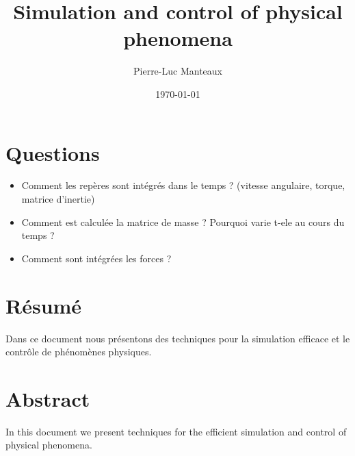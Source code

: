 \documentclass[11pt, oneside, a4paper]{memoir}
\begin{document}
\title{Simulation and control of physical phenomena}
\author{Pierre-Luc Manteaux}
\date{\today}
\maketitle

\frontmatter



\chapter{Questions}

\begin{itemize}
\item Comment les repères sont intégrés dans le temps ? (vitesse angulaire, torque, matrice d'inertie)
\item Comment est calculée la matrice de masse ? Pourquoi varie t-ele au cours du temps ?
\item Comment sont intégrées les forces ?
\end{itemize}

\chapter{R\'esum\'e}
Dans ce document nous pr\'esentons des techniques pour la simulation efficace et le contr\^ole de ph\'enom\`enes physiques.

\chapter{Abstract}
In this document we present techniques for the efficient simulation and control of physical phenomena.
\end{document}
